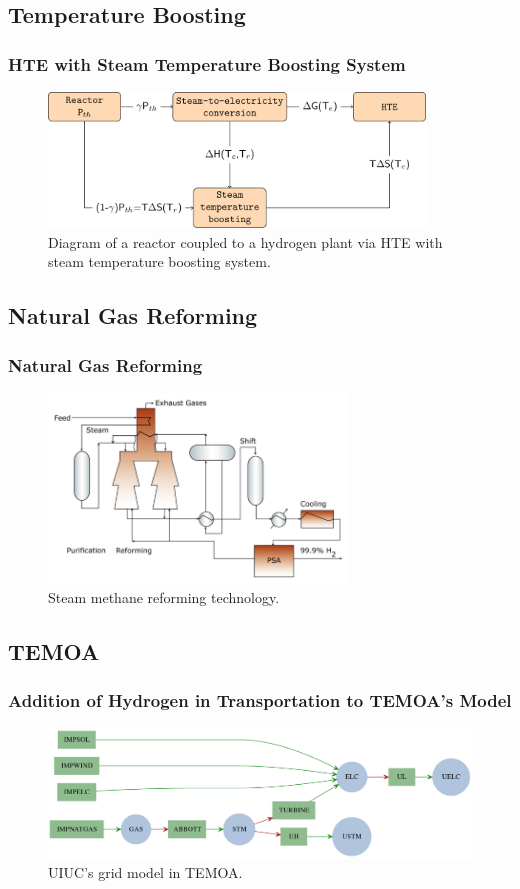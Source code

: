 \subsection{Temperature Boosting}
\begin{frame}
\frametitle{HTE with Steam Temperature Boosting System}
	\begin{figure}[htbp!]
		\begin{center}
			\includegraphics[width=10cm]{images/hte2-figure0.png}
		\end{center}
		\caption{Diagram of a reactor coupled to a hydrogen plant via HTE with steam temperature boosting system.}
	\end{figure}
\end{frame}

\subsection{Natural Gas Reforming}
\begin{frame}
\frametitle{Natural Gas Reforming}
	\begin{figure}[htbp!]
		\begin{center}
			\includegraphics[width=8cm]{images/steam-methane.png}
		\end{center}
		\caption{Steam methane reforming technology.}
	\end{figure}
\end{frame}

\subsection{TEMOA}
\begin{frame}
\frametitle{Addition of Hydrogen in Transportation to TEMOA's Model}
	\begin{figure}[htbp!]
		\begin{center}
			\includegraphics[width=12cm]{images/bau_temoa_uiuc.png}
		\end{center}
		\caption{UIUC's grid model in TEMOA.}
	\end{figure}
\end{frame}